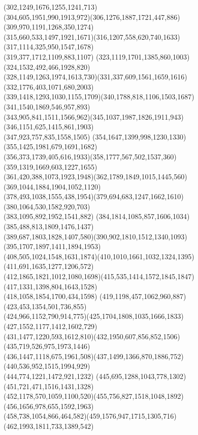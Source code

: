 \documentclass[a4paper,twopage,reqno,12pt]{amsart}
\theoremstyle{definition}
\numberwithin{equation}{section}
\begin{document}
\begin{enumerate}
{{(302,1249,1676,1255,1241,713)\\(304,605,1951,990,1913,972)(306,1276,1887,1721,447,886)(309,970,1191,1268,350,1274)\\
(315,660,533,1497,1921,1671)(316,1207,558,620,740,1633)(317,1114,325,950,1547,1678)\\(319,377,1712,1109,883,1107)
(323,1119,1701,1385,860,1003)(324,1532,492,466,1928,820)\\(328,1149,1263,1974,1613,730)(331,337,609,1561,1659,1616)
(332,1776,403,1071,680,2003)\\(339,1418,1293,1030,1155,1709)(340,1788,818,1106,1503,1687)(341,1540,1869,546,957,893)\\
(343,905,841,1511,1566,962)(345,1037,1987,1826,1911,943)(346,1151,625,1415,861,1903)\\(347,923,757,835,1558,1505)
(354,1647,1399,998,1230,1330)(355,1425,1981,679,1691,1682)\\(356,373,1739,405,616,1933)(358,1777,567,502,1537,360)
(359,1319,1669,603,1227,1655)\\(361,420,388,1073,1923,1948)(362,1789,1849,1015,1445,560)(369,1044,1884,1904,1052,1120)\\
(378,493,1038,1555,438,1954)(379,694,683,1247,1662,1610)(380,1064,530,1582,920,703)\\(383,1095,892,1952,1541,882)
(384,1814,1085,857,1606,1034)(385,488,813,1809,1476,1437)\\(389,687,1803,1828,1407,580)(390,902,1810,1512,1340,1093)
(395,1707,1897,1411,1894,1953)\\(408,505,1024,1548,1631,1874)(410,1010,1661,1032,1324,1395)(411,691,1635,1277,1206,572)\\
(412,1865,1821,1012,1080,1698)(415,535,1414,1572,1845,1847)(417,1331,1398,804,1643,1528)\\(418,1058,1854,1700,434,1598)
(419,1198,457,1062,960,887)(423,453,1354,501,736,855)\\(424,966,1152,790,914,775)(425,1704,1808,1035,1666,1833)
(427,1552,1177,1412,1602,729)\\(431,1477,1220,593,1612,810)(432,1950,607,856,852,1506)(435,719,526,975,1973,1446)\\
(436,1447,1118,675,1961,508)(437,1499,1366,870,1886,752)(440,536,952,1515,1994,929)\\(444,774,1221,1472,921,1232)
(445,695,1288,1043,778,1302)(451,721,471,1516,1431,1328)\\(452,1178,570,1059,1100,520)(455,756,827,1518,1048,1892)
(456,1656,978,655,1592,1963)\\(458,738,1054,866,464,582)(459,1576,947,1715,1305,716)(462,1993,1811,733,1389,542)\\
}}
\end{enumerate}
\end{document}
